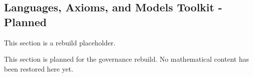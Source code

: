 
\subsection*{Languages, Axioms, and Models Toolkit - Planned}

\begin{exposition}
This section is a rebuild placeholder.
\end{exposition}

\begin{exposition}
This section is planned for the governance rebuild. No mathematical content has
been restored here yet.
\end{exposition}










